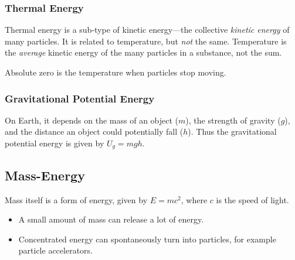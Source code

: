 \documentclass[class=article, crop=false]{standalone}
\begin{document}
  \subsubsection{Thermal Energy}
  Thermal energy is a sub-type of kinetic energy---the collective \emph{kinetic energy} of many particles. It is related to temperature, but \emph{not} the same. Temperature is the \emph{average} kinetic energy of the many particles in a substance, not the sum.
  \begin{note}{}
    Absolute zero is the temperature when particles stop moving.
  \end{note}
  \subsubsection{Gravitational Potential Energy}
  On Earth, it depends on the mass of an object ($m$), the strength of gravity ($g$), and the distance an object could potentially fall ($h$). Thus the gravitational potential energy is given by $U_g = mgh$.
  \subsection{Mass-Energy}
  Mass itself is a form of energy, given by $E = mc^2$, where $c$ is the speed of light.
  \begin{itemize}
    \item A small amount of mass can release a lot of energy.
    \item Concentrated energy can spontaneously turn into particles, for example particle accelerators.
  \end{itemize}
\end{document}
